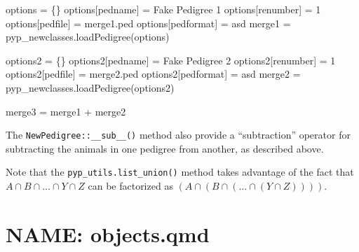 \documentclass[
  letterpaper,
  DIV=11,
  numbers=noendperiod]{scrreprt}
\newenvironment{Shaded}{\begin{snugshade}}{\end{snugshade}}
\newcommand{\DecValTok}[1]{\textcolor[rgb]{0.68,0.00,0.00}{#1}}
\newcommand{\NormalTok}[1]{\textcolor[rgb]{0.00,0.23,0.31}{#1}}
\newcommand{\OperatorTok}[1]{\textcolor[rgb]{0.37,0.37,0.37}{#1}}
\newcommand{\StringTok}[1]{\textcolor[rgb]{0.13,0.47,0.30}{#1}}
\begin{document}
\begin{Shaded}
\begin{Highlighting}[]
\NormalTok{options }\OperatorTok{=}\NormalTok{ \{\}}
\NormalTok{options[}\StringTok{\textquotesingle{}pedname\textquotesingle{}}\NormalTok{] }\OperatorTok{=} \StringTok{\textquotesingle{}Fake Pedigree 1\textquotesingle{}}
\NormalTok{options[}\StringTok{\textquotesingle{}renumber\textquotesingle{}}\NormalTok{] }\OperatorTok{=} \DecValTok{1}
\NormalTok{options[}\StringTok{\textquotesingle{}pedfile\textquotesingle{}}\NormalTok{] }\OperatorTok{=} \StringTok{\textquotesingle{}merge1.ped\textquotesingle{}}
\NormalTok{options[}\StringTok{\textquotesingle{}pedformat\textquotesingle{}}\NormalTok{] }\OperatorTok{=} \StringTok{\textquotesingle{}asd\textquotesingle{}}
\NormalTok{merge1 }\OperatorTok{=}\NormalTok{ pyp\_newclasses.loadPedigree(options)}

\NormalTok{options2 }\OperatorTok{=}\NormalTok{ \{\}}
\NormalTok{options2[}\StringTok{\textquotesingle{}pedname\textquotesingle{}}\NormalTok{] }\OperatorTok{=} \StringTok{\textquotesingle{}Fake Pedigree 2\textquotesingle{}}
\NormalTok{options2[}\StringTok{\textquotesingle{}renumber\textquotesingle{}}\NormalTok{] }\OperatorTok{=} \DecValTok{1}
\NormalTok{options2[}\StringTok{\textquotesingle{}pedfile\textquotesingle{}}\NormalTok{] }\OperatorTok{=} \StringTok{\textquotesingle{}merge2.ped\textquotesingle{}}
\NormalTok{options2[}\StringTok{\textquotesingle{}pedformat\textquotesingle{}}\NormalTok{] }\OperatorTok{=} \StringTok{\textquotesingle{}asd\textquotesingle{}}
\NormalTok{merge2 }\OperatorTok{=}\NormalTok{ pyp\_newclasses.loadPedigree(options2)}

\NormalTok{merge3 }\OperatorTok{=}\NormalTok{ merge1 }\OperatorTok{+}\NormalTok{ merge2}
\end{Highlighting}
\end{Shaded}

The \texttt{NewPedigree::\_\_sub\_\_()} method also provide a
``subtraction'' operator for subtracting the animals in one pedigree
from another, as described above.

Note that the \texttt{pyp\_utils.list\_union()} method takes advantage
of the fact that \(A \cap B \cap \ldots \cap Y \cap Z\) can be
factorized as \((A \cap (B \cap (\ldots \cap (Y \cap Z))))\).


\chapter{NAME: objects.qmd}\label{name-objects.qmd}
\end{document}
